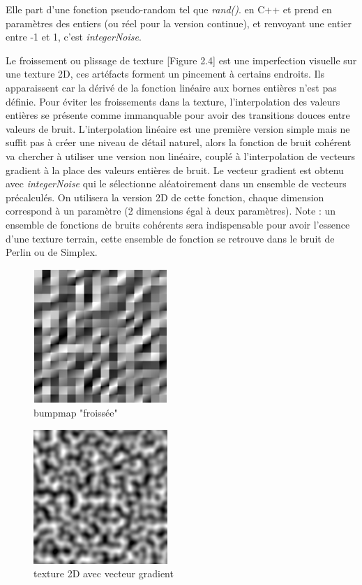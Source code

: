 \documentclass[12pt]{report}
\begin{document}
\begin{enumerate}
    Elle part d'une fonction pseudo-random tel que \textit{rand()}. en C++ et prend en paramètres des entiers (ou réel pour la version continue), et renvoyant une entier entre -1 et 1, c'est \textit{integerNoise}.
    
    Le froissement ou plissage de texture [Figure 2.4] est une imperfection visuelle sur une texture 2D, ces artéfacts forment un pincement à certains endroits. Ils apparaissent car la dérivé de la fonction linéaire aux bornes entières n'est pas définie. Pour éviter les froissements dans la texture, l'interpolation des valeurs entières se présente comme immanquable pour avoir des transitions douces entre valeurs de bruit. L'interpolation linéaire est une première version simple mais ne suffit pas à créer une niveau de détail naturel, alors la fonction de bruit cohérent va chercher à utiliser une version non linéaire, couplé à l'interpolation de vecteurs gradient à la place des valeurs entières de bruit. Le vecteur gradient est obtenu avec \textit{integerNoise} qui le sélectionne aléatoirement dans un ensemble de vecteurs précalculés. On utilisera la version 2D de cette fonction, chaque dimension correspond à un paramètre (2 dimensions égal à deux paramètres).
    Note : un ensemble de fonctions de bruits cohérents sera indispensable pour avoir l'essence d'une texture terrain, cette ensemble de fonction se retrouve dans le bruit de Perlin ou de Simplex.
    
     \begin{figure}[h]
        \centering
        \includegraphics[scale = 0.7]{images/bumpvalue.png}
        \caption{bumpmap "froissée"}
    \end{figure}
    
    \begin{figure}[h]
        \centering
        \includegraphics[scale = 0.5]{images/gradientcoherentnoise2d.png}
        \caption{texture 2D avec vecteur gradient}
    \end{figure}
    
\end{enumerate}
\end{document}
